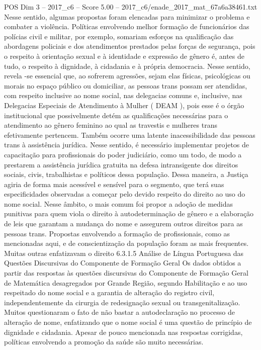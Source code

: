 \begin{textsample}{POS Dim 3 – 2017\_c6 – Score 5.00 – 2017\_c6/enade\_2017\_mat\_67a6a38461.txt}
Nesse sentido, algumas propostas foram elencadas para minimizar o problema e combater a violência.
Políticas envolvendo melhor formação de funcionários das polícias civil e militar, por exemplo, somariam esforços na qualificação das abordagens policiais e dos atendimentos prestados pelas forças de segurança, pois o respeito à orientação sexual e à identidade e expressão de gênero é, antes de tudo, o respeito à dignidade, à cidadania e à própria democracia.
Nesse sentido, revela -se essencial que, ao sofrerem agressões, sejam elas físicas, psicológicas ou morais no espaço público ou domiciliar, as pessoas trans possam ser atendidas, com respeito inclusive ao nome social, nas delegacias comuns e, inclusive, nas Delegacias Especiais de Atendimento à Mulher ( DEAM ), pois esse é o órgão institucional que possivelmente detém as qualificações necessárias para o atendimento ao gênero feminino ao qual as travestis e mulheres trans efetivamente pertencem.
Também ocorre uma latente inacessibilidade das pessoas trans à assistência jurídica.
Nesse sentido, é necessário implementar projetos de capacitação para profissionais do poder judiciário, como um todo, de modo a prestarem a assistência jurídica gratuita na defesa intransigente dos direitos sociais, civis, trabalhistas e políticos dessa população.
Dessa maneira, a Justiça agiria de forma mais acessível e sensível para o segmento, que terá suas especificidades observadas a começar pelo devido respeito do direito ao uso do nome social.
Nesse âmbito, o mais comum foi propor a adoção de medidas punitivas para quem viola o direito à autodeterminação de gênero e a elaboração de leis que garantam a mudança do nome e assegurem outros direitos para as pessoas trans.
Propostas envolvendo a formação de profissionais, como as mencionadas aqui, e de conscientização da população foram as mais frequentes.
Muitas outras enfatizavam o direito 6.3.1.5 Análise de Língua Portuguesa das Questões Discursivas do Componente de Formação Geral Os dados obtidos a partir das respostas às questões discursivas do Componente de Formação Geral de Matemática desagregados por Grande Região, segundo Habilitação e ao uso respeitado do nome social e a garantia de alteração do registro civil, independentemente da cirurgia de redesignação sexual ou transgenitalização.
Muitos questionaram o fato de não bastar a autodeclaração no processo de alteração de nome, enfatizando que o nome social é uma questão de princípio de dignidade e cidadania.
Apesar de pouco mencionada nas respostas corrigidas, políticas envolvendo a promoção da saúde são muito necessárias.

\end{textsample}
